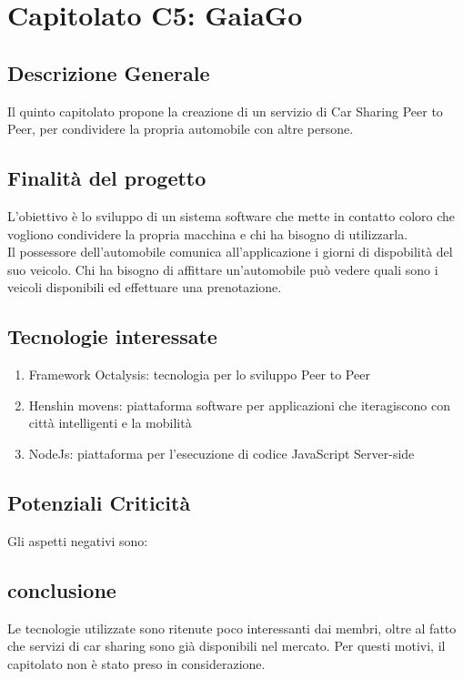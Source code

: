 \chapter{Capitolato C5: GaiaGo}
\section{Descrizione Generale}

Il quinto capitolato propone la creazione di un servizio di Car Sharing Peer to Peer, per condividere la propria automobile con altre persone.\\


\section{Finalit\`a del progetto}
L'obiettivo è lo sviluppo di un sistema software che mette in contatto coloro che vogliono condividere la propria macchina e chi ha bisogno di utilizzarla.\\
Il possessore dell'automobile comunica all'applicazione i giorni di dispobilit\`a del suo veicolo.
Chi ha bisogno di affittare un'automobile può vedere quali sono i veicoli disponibili ed effettuare una prenotazione.

\section{Tecnologie interessate}
\begin{enumerate}
\item Framework Octalysis: tecnologia per lo sviluppo Peer to Peer
\item Henshin movens: piattaforma software per applicazioni che iteragiscono con città intelligenti e la mobilità
\item NodeJs: piattaforma per l'esecuzione di codice JavaScript Server-side
\end{enumerate}
\section{Potenziali Criticità}
Gli aspetti negativi sono:
\section{conclusione}
Le tecnologie utilizzate sono ritenute poco interessanti dai membri, oltre al fatto che servizi di car sharing sono già disponibili nel mercato. Per questi motivi, il capitolato non è stato preso in considerazione. 